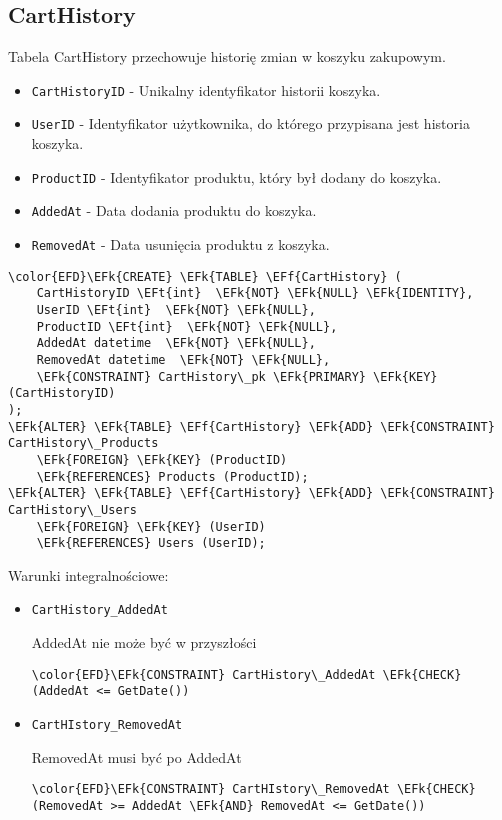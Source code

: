 \documentclass[11pt]{article}
\newcommand{\EFk}[1]{\textcolor{EFk}{\textbf{#1}}} %
\newcommand{\EFf}[1]{\textcolor{EFf}{#1}} %
\newcommand{\EFt}[1]{\textcolor{EFt}{\textbf{#1}}} %
\begin{document}
\subsection{CartHistory}
\label{sec:org431df93}
Tabela CartHistory przechowuje historię zmian w koszyku zakupowym.
\begin{itemize}
\item \texttt{CartHistoryID} - Unikalny identyfikator historii koszyka.
\item \texttt{UserID} - Identyfikator użytkownika, do którego przypisana jest historia koszyka.
\item \texttt{ProductID} - Identyfikator produktu, który był dodany do koszyka.
\item \texttt{AddedAt} - Data dodania produktu do koszyka.
\item \texttt{RemovedAt} - Data usunięcia produktu z koszyka.
\end{itemize}
\begin{Code}
\begin{Verbatim}
\color{EFD}\EFk{CREATE} \EFk{TABLE} \EFf{CartHistory} (
    CartHistoryID \EFt{int}  \EFk{NOT} \EFk{NULL} \EFk{IDENTITY},
    UserID \EFt{int}  \EFk{NOT} \EFk{NULL},
    ProductID \EFt{int}  \EFk{NOT} \EFk{NULL},
    AddedAt datetime  \EFk{NOT} \EFk{NULL},
    RemovedAt datetime  \EFk{NOT} \EFk{NULL},
    \EFk{CONSTRAINT} CartHistory\_pk \EFk{PRIMARY} \EFk{KEY}  (CartHistoryID)
);
\EFk{ALTER} \EFk{TABLE} \EFf{CartHistory} \EFk{ADD} \EFk{CONSTRAINT} CartHistory\_Products
    \EFk{FOREIGN} \EFk{KEY} (ProductID)
    \EFk{REFERENCES} Products (ProductID);
\EFk{ALTER} \EFk{TABLE} \EFf{CartHistory} \EFk{ADD} \EFk{CONSTRAINT} CartHistory\_Users
    \EFk{FOREIGN} \EFk{KEY} (UserID)
    \EFk{REFERENCES} Users (UserID);
\end{Verbatim}
\end{Code}
Warunki integralnościowe:


\begin{itemize}
\item \texttt{CartHistory\_AddedAt}

AddedAt nie może być w przyszłości
\begin{Code}
\begin{Verbatim}
\color{EFD}\EFk{CONSTRAINT} CartHistory\_AddedAt \EFk{CHECK}
(AddedAt <= GetDate())
\end{Verbatim}
\end{Code}
\item \texttt{CartHIstory\_RemovedAt}

RemovedAt musi być po AddedAt
\begin{Code}
\begin{Verbatim}
\color{EFD}\EFk{CONSTRAINT} CartHIstory\_RemovedAt \EFk{CHECK}
(RemovedAt >= AddedAt \EFk{AND} RemovedAt <= GetDate())
\end{Verbatim}
\end{Code}
\end{itemize}
\end{document}
